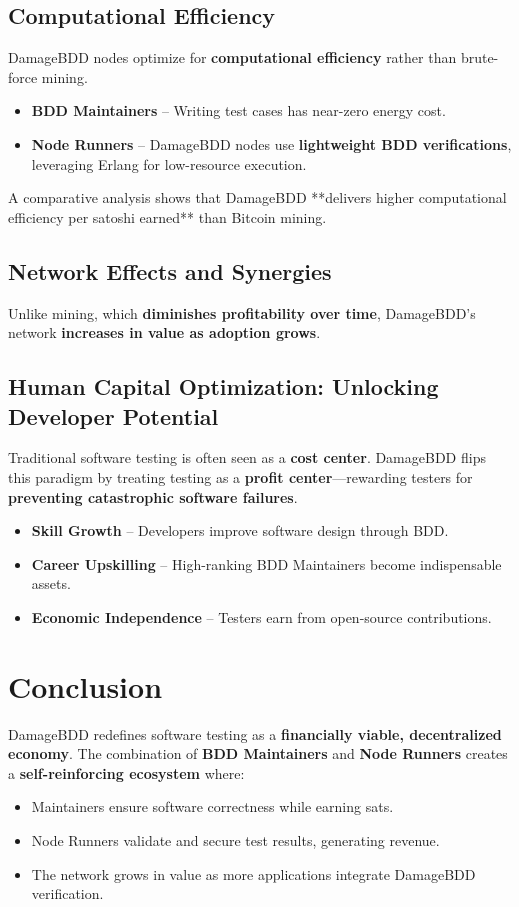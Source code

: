 \documentclass[a4paper,12pt]{article}
\begin{document}
\subsection{Computational Efficiency}
DamageBDD nodes optimize for \textbf{computational efficiency} rather than brute-force mining.

\begin{itemize}
    \item \textbf{BDD Maintainers} – Writing test cases has near-zero energy cost.
    \item \textbf{Node Runners} – DamageBDD nodes use \textbf{lightweight BDD verifications}, leveraging Erlang for low-resource execution.
\end{itemize}

A comparative analysis shows that DamageBDD **delivers higher computational efficiency per satoshi earned** than Bitcoin mining.

\subsection{Network Effects and Synergies}
Unlike mining, which \textbf{diminishes profitability over time}, DamageBDD’s network \textbf{increases in value as adoption grows}.

\subsection{Human Capital Optimization: Unlocking Developer Potential}
Traditional software testing is often seen as a \textbf{cost center}. DamageBDD flips this paradigm by treating testing as a \textbf{profit center}—rewarding testers for \textbf{preventing catastrophic software failures}.

\begin{itemize}
    \item \textbf{Skill Growth} – Developers improve software design through BDD.
    \item \textbf{Career Upskilling} – High-ranking BDD Maintainers become indispensable assets.
    \item \textbf{Economic Independence} – Testers earn from open-source contributions.
\end{itemize}

\section{Conclusion}
DamageBDD redefines software testing as a \textbf{financially viable, decentralized economy}. The combination of \textbf{BDD Maintainers} and \textbf{Node Runners} creates a \textbf{self-reinforcing ecosystem} where:
\begin{itemize}
    \item Maintainers ensure software correctness while earning sats.
    \item Node Runners validate and secure test results, generating revenue.
    \item The network grows in value as more applications integrate DamageBDD verification.
\end{itemize}
\end{document}
